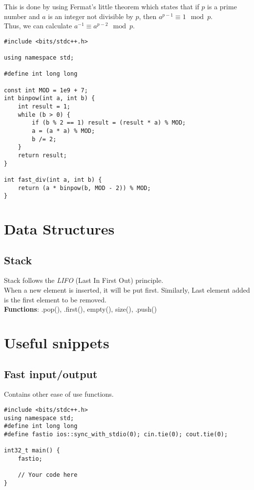 \documentclass{notes}
\begin{document}
This is done by using Fermat's little theorem which states that if \(p\) is a prime number and \(a\) is an integer not divisible by \(p\), then \(a^{p-1} \equiv 1 \mod p\). \\
Thus, we can calculate \(a^{-1} \equiv a^{p-2} \mod p\).

\begin{verbatim}
#include <bits/stdc++.h>

using namespace std;

#define int long long

const int MOD = 1e9 + 7;
int binpow(int a, int b) {
    int result = 1;
    while (b > 0) {
        if (b % 2 == 1) result = (result * a) % MOD;
        a = (a * a) % MOD;
        b /= 2;
    }
    return result;
}

int fast_div(int a, int b) {
    return (a * binpow(b, MOD - 2)) % MOD;
}
\end{verbatim}

\section{Data Structures}
\subsection{Stack}
Stack follows the \emph{LIFO} (Last In First Out) principle. \\
When a new element is inserted, it will be put first. Similarly, 
Last element added is the first element to be removed. \\

\textbf{Functions}: .pop(), .first(), empty(), size(), .push() 

\section{Useful snippets}
\subsection{Fast input/output}
Contains other ease of use functions.
\begin{verbatim}
#include <bits/stdc++.h>
using namespace std;
#define int long long
#define fastio ios::sync_with_stdio(0); cin.tie(0); cout.tie(0);

int32_t main() {
    fastio;

    // Your code here
}
\end{verbatim}
\end{document}
